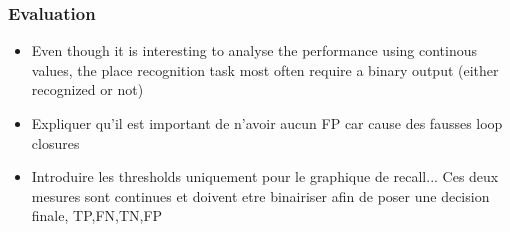 \subsubsection{Evaluation}
\label{ssec:chap_slam_results_evaluation}

\begin{itemize}
    \item Even though it is interesting to analyse the performance using continous values, the place recognition task most often require a binary output (either recognized or not)
    \item Expliquer qu'il est important de n'avoir aucun FP car cause des fausses loop closures
    \item Introduire les thresholds uniquement pour le graphique de recall... Ces deux mesures sont continues et doivent etre binairiser afin de poser une decision finale, TP,FN,TN,FP
\end{itemize}


\begin{figure}[H]
    \centering
    \caption[todo]{}
    \label{fig:chap_slam_results_paths}
\end{figure}

